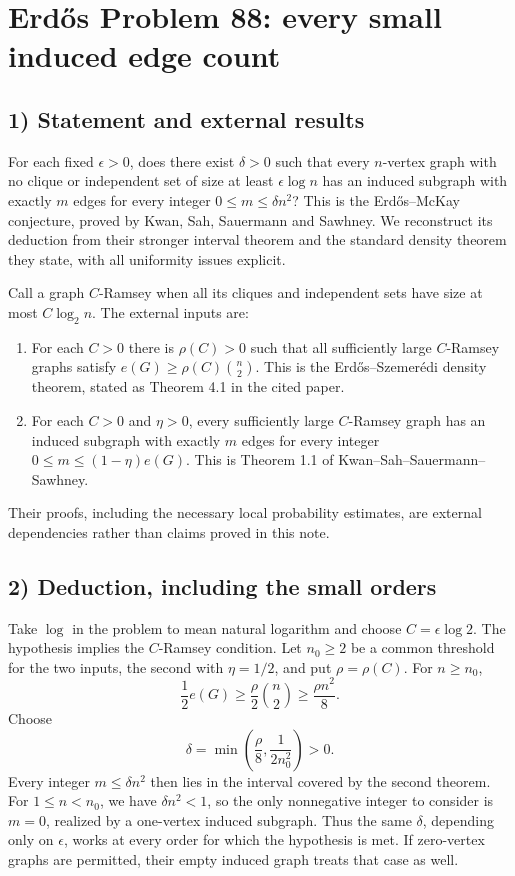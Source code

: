 \section{Erd\H{o}s Problem 88: every small induced edge count}

\subsection{1) Statement and external results}
For each fixed $\epsilon>0$, does there exist $\delta>0$ such that
every $n$-vertex graph with no clique or independent set of size
at least $\epsilon\log n$ has an induced subgraph with exactly
$m$ edges for every integer $0\leq m\leq\delta n^2$?
This is the Erd\H{o}s--McKay conjecture, proved by Kwan, Sah,
Sauermann and Sawhney. We reconstruct its deduction from their
stronger interval theorem and the standard density theorem they
state, with all uniformity issues explicit.

Call a graph $C$-Ramsey when all its cliques and independent sets
have size at most $C\log_2 n$. The external inputs are:
\begin{enumerate}
\item For each $C>0$ there is $\rho(C)>0$ such that all sufficiently
large $C$-Ramsey graphs satisfy
$e(G)\geq\rho(C)\binom n2$. This is the Erd\H{o}s--Szemer\'edi
density theorem, stated as Theorem 4.1 in the cited paper.
\item For each $C>0$ and $\eta>0$, every sufficiently large
$C$-Ramsey graph has an induced subgraph with exactly $m$ edges
for every integer $0\leq m\leq(1-\eta)e(G)$.
This is Theorem 1.1 of Kwan--Sah--Sauermann--Sawhney.
\end{enumerate}
Their proofs, including the necessary local probability estimates,
are external dependencies rather than claims proved in this note.

\subsection{2) Deduction, including the small orders}
Take $\log$ in the problem to mean natural logarithm and choose
$C=\epsilon\log2$. The hypothesis implies the $C$-Ramsey
condition. Let $n_0\geq2$ be a common threshold for the two inputs,
the second with $\eta=1/2$, and put $\rho=\rho(C)$.
For $n\geq n_0$,
\[
 \frac12e(G)\geq\frac{\rho}{2}\binom n2
               \geq\frac{\rho n^2}{8}.
\]
Choose
\[
 \delta=\min\left(\frac\rho8,\frac1{2n_0^2}\right)>0.
\]
Every integer $m\leq\delta n^2$ then lies in the interval covered
by the second theorem. For $1\leq n<n_0$, we have
$\delta n^2<1$, so the only nonnegative integer to consider is
$m=0$, realized by a one-vertex induced subgraph. Thus the same
$\delta$, depending only on $\epsilon$, works at every order for
which the hypothesis is met. If zero-vertex graphs are permitted,
their empty induced graph treats that case as well.

